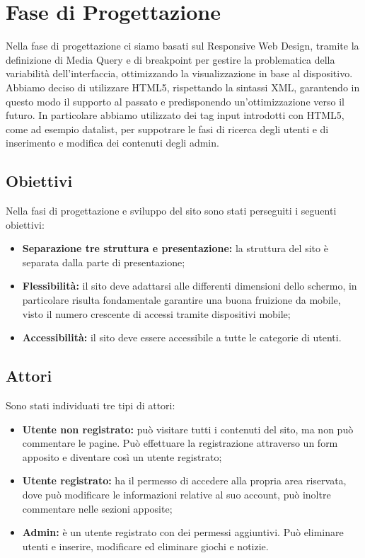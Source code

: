 \section{Fase di Progettazione}
Nella fase di progettazione ci siamo basati sul Responsive Web Design, tramite la definizione di Media Query e di
breakpoint per gestire la problematica della variabilità dell'interfaccia, ottimizzando la visualizzazione in base al dispositivo.
Abbiamo deciso di utilizzare HTML5, rispettando la sintassi XML, garantendo in questo modo il supporto al passato e predisponendo un'ottimizzazione verso il futuro.
In particolare abbiamo utilizzato dei tag input introdotti con HTML5, come ad esempio datalist, per suppotrare le fasi di ricerca degli utenti e di inserimento e modifica dei contenuti degli admin. 

\subsection{Obiettivi}
Nella fasi di progettazione e sviluppo del sito sono stati perseguiti i seguenti obiettivi:
\begin{itemize}
	\item  \textbf{Separazione tre struttura e presentazione:} la struttura del sito è separata dalla parte di presentazione;
	\item  \textbf{Flessibilità:} il sito deve adattarsi alle differenti dimensioni dello schermo, in particolare risulta fondamentale garantire una buona fruizione da mobile, visto il numero crescente di accessi tramite dispositivi mobile;
	\item  \textbf{Accessibilità:} il sito deve essere accessibile a tutte le categorie di utenti.
\end{itemize}

\subsection{Attori}
Sono stati individuati tre tipi di attori:
\begin{itemize}
	\item \textbf{Utente non registrato:} può visitare tutti i contenuti del sito, ma non può commentare le pagine. Può effettuare la registrazione attraverso un form apposito e diventare così un utente registrato;
	\item \textbf{Utente registrato:} ha il permesso di accedere alla propria area riservata, dove può modificare le informazioni relative al suo account, può inoltre commentare nelle sezioni apposite;
	\item \textbf{Admin:} è un utente registrato con dei permessi aggiuntivi. Può eliminare utenti e inserire, modificare ed eliminare giochi e notizie.
\end{itemize}


